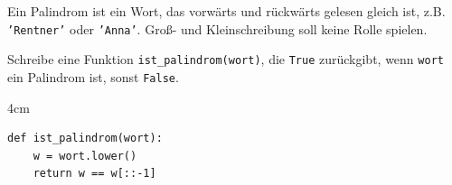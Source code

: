 \question[3]
Ein Palindrom ist ein Wort, das vorwärts und rückwärts gelesen gleich ist, z.B. \texttt{'Rentner'} oder \texttt{'Anna'}.
Groß- und Kleinschreibung soll keine Rolle spielen.

Schreibe eine Funktion \texttt{ist\_palindrom(wort)}, die \texttt{True} zurückgibt, wenn \texttt{wort} ein Palindrom ist,
sonst \texttt{False}.

\begin{solutionbox}{4cm}
\begin{lstlisting}
def ist_palindrom(wort):
    w = wort.lower()
    return w == w[::-1]
\end{lstlisting}
\end{solutionbox}
